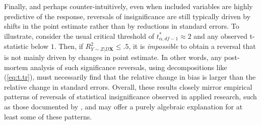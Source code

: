 \documentclass[sts]{imsart}
\theoremstyle{plain}
\theoremstyle{definition}
\newcommand{\df}{df}
\newcommand{\Ry}{R^2_{Y\sim Z | D\mathbf{X}}}
\begin{document}
Finally, and perhaps counter-intuitively, even when included variables are highly predictive of the response, reversals of insignificance are still typically  driven by shifts in the point estimate rather than by reductions in standard errors. To illustrate, consider the usual critical threshold of $t^*_{\alpha, \df-1}\approx 2$ and any observed t-statistic below $1$. Then, if $\Ry \leq .5$, it is \emph{impossible} to obtain a reversal that is not mainly driven by changes in point estimate. In other words, any post-mortem analysis of such significance reversals, using decompositions like (\ref{eq:t.tr}), must necessarily find that the relative change in bias is larger than the relative change in standard errors.  Overall, these results closely mirror  empirical patterns of reversals of statistical insignificance observed in applied research, such as those documented by \cite{lenz2021achieving}, and may offer a purely algebraic explanation for at least some of these patterns.
\end{document}
